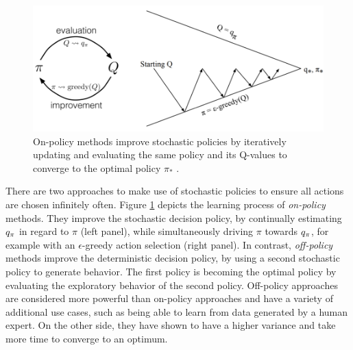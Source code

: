 \documentclass[a4paper, 12pt]{article}
\let\cite\shortcite
\begin{document}
\begin{figure}[htbp]
\centering
\includegraphics[width=0.85\linewidth]{fig/on-policy.png}
\caption[On-Policy Control]{On-policy methods improve stochastic policies by iteratively updating and evaluating the same policy and its Q-values to converge to the optimal policy \(\pi_*\) \cite{sutton18_reinf}. \protect\footnotemark \label{fig-sarsa}}
\end{figure}

There are two approaches to make use of stochastic policies to ensure all
actions are chosen infinitely often. Figure \ref{fig-sarsa} depicts the learning
process of \emph{on-policy} methods. They improve the stochastic decision policy, by
continually estimating \(q_\pi\) in regard to \(\pi\) (left panel), while
simultaneously driving \(\pi\) towards \(q_\pi\), for example with an \(\epsilon\)-greedy
action selection (right panel). In contrast, \emph{off-policy} methods improve the
deterministic decision policy, by using a second stochastic policy to generate
behavior. The first policy is becoming the optimal policy by evaluating the
exploratory behavior of the second policy. Off-policy approaches are
considered more powerful than on-policy approaches and have a variety of
additional use cases, such as being able to learn from data generated by a human
expert. On the other side, they have shown to have a higher variance and take
more time to converge to an optimum.
\end{document}
